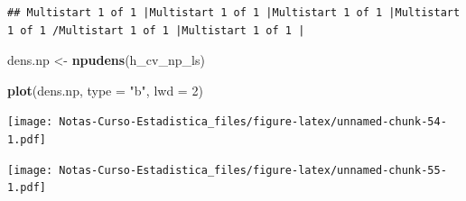 \documentclass[
  12pt,
]{book}
\newenvironment{Shaded}{\begin{snugshade}}{\end{snugshade}}
\newcommand{\DataTypeTok}[1]{\textcolor[rgb]{0.13,0.29,0.53}{#1}}
\newcommand{\DecValTok}[1]{\textcolor[rgb]{0.00,0.00,0.81}{#1}}
\newcommand{\KeywordTok}[1]{\textcolor[rgb]{0.13,0.29,0.53}{\textbf{#1}}}
\newcommand{\NormalTok}[1]{#1}
\newcommand{\OperatorTok}[1]{\textcolor[rgb]{0.81,0.36,0.00}{\textbf{#1}}}
\newcommand{\StringTok}[1]{\textcolor[rgb]{0.31,0.60,0.02}{#1}}
\theoremstyle{definition}
\theoremstyle{definition}
\theoremstyle{definition}
\theoremstyle{remark}
\begin{document}
\begin{verbatim}
## Multistart 1 of 1 |Multistart 1 of 1 |Multistart 1 of 1 |Multistart 1 of 1 /Multistart 1 of 1 |Multistart 1 of 1 |                   
\end{verbatim}

\begin{Shaded}
\begin{Highlighting}[]
\NormalTok{dens.np <-}\StringTok{ }\KeywordTok{npudens}\NormalTok{(h_cv_np_ls)}

\KeywordTok{plot}\NormalTok{(dens.np, }\DataTypeTok{type =} \StringTok{"b"}\NormalTok{, }\DataTypeTok{lwd =} \DecValTok{2}\NormalTok{)}
\end{Highlighting}
\end{Shaded}

\texttt{[image: Notas-Curso-Estadistica\_files/figure-latex/unnamed-chunk-54-1.pdf]}

\begin{Shaded}
\end{Shaded}

\texttt{[image: Notas-Curso-Estadistica\_files/figure-latex/unnamed-chunk-55-1.pdf]}
\end{document}
